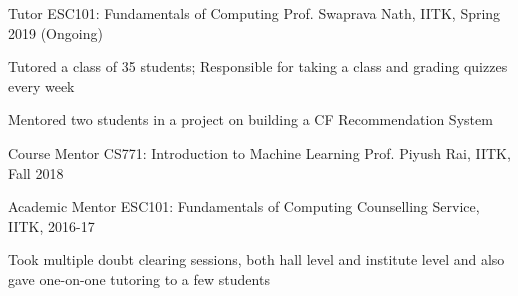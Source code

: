 
\begin{cventries}
	\cventry
	{Tutor}
	{ESC101: Fundamentals of Computing}
	{Prof. Swaprava Nath, IITK, Spring 2019 (Ongoing)}
	{}
	{}
	{
		\begin{cvitems}
		\item Tutored a class of 35 students; Responsible for taking a class and grading quizzes every week
		\item Mentored two students in a project on building a CF Recommendation System
		\end{cvitems}
	}

	\cventry
	{Course Mentor}
	{CS771: Introduction to Machine Learning}
	{Prof. Piyush Rai, IITK, Fall 2018}
	{}
	{}
	{}

	\cventry
	{Academic Mentor}
	{ESC101: Fundamentals of Computing}
	{Counselling Service, IITK, 2016-17}
	{}
	{}
	{
		\begin{cvitems}
		\item Took multiple doubt clearing sessions, both hall level and institute level and also gave one-on-one tutoring to a few students
		\end{cvitems}
	}

\end{cventries}
